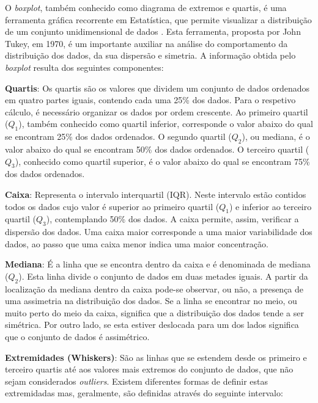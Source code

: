 O \textit{boxplot}, também conhecido como diagrama de extremos e quartis, é uma ferramenta gráfica recorrente em Estatística, que permite visualizar a distribuição de um conjunto unidimensional de dados\cite{casella2002statistical} \cite{ross2014introduction}. Esta ferramenta, proposta por John Tukey, em 1970, é um importante auxiliar na análise do comportamento da distribuição dos dados, da sua dispersão e simetria. A informação obtida pelo \textit{boxplot} resulta dos seguintes componentes: 


\begin{my_itemize}
	
	\item \textbf{Quartis}: Os quartis são os valores que dividem um conjunto de dados ordenados em quatro partes iguais, contendo cada uma 25\% dos dados. Para o respetivo cálculo, é necessário organizar os dados por ordem crescente. Ao primeiro quartil ($Q_1$), também conhecido como quartil inferior, corresponde o valor abaixo do qual se encontram 25\% dos dados ordenados. O segundo quartil ($Q_2$), ou mediana, é o valor abaixo do qual se encontram 50\% dos dados ordenados. O terceiro quartil ($Q_3$), conhecido como quartil superior, é o valor abaixo do qual se encontram 75\% dos dados ordenados.
	
	\item \textbf{Caixa}: Representa o intervalo interquartil (IQR). Neste intervalo estão contidos  todos os dados cujo valor é superior ao primeiro quartil ($Q_1$) e inferior ao terceiro quartil ($Q_3$), contemplando 50\% dos dados. A caixa permite, assim, verificar a dispersão dos dados. Uma caixa maior corresponde a uma maior variabilidade dos dados, ao passo que uma caixa menor indica uma maior concentração. 
	
	\item \textbf{Mediana}: É a linha que se encontra dentro da caixa e é denominada de mediana ($Q_2$). Esta linha divide o conjunto de dados em duas metades iguais. A partir da localização da mediana dentro da caixa pode-se observar, ou não, a presença de uma assimetria na distribuição dos dados. Se a linha se encontrar no meio, ou muito perto do meio da caixa, significa que a distribuição dos dados tende a ser simétrica. Por outro lado, se esta estiver deslocada para um dos lados significa que o conjunto de dados é assimétrico. 
	
	\item \textbf{Extremidades (Whiskers)}: São as linhas que se estendem desde os primeiro e terceiro quartis até aos valores mais extremos do conjunto de dados, que não sejam considerados \textit{outliers}. Existem diferentes formas de definir estas extremidadas\cite{spe}  mas, geralmente, são definidas através do seguinte intervalo: 
	

\end{my_itemize}
